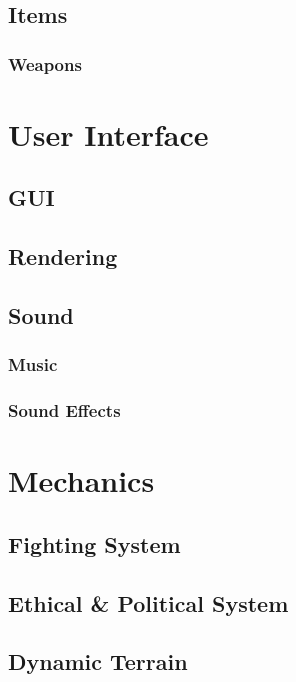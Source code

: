 \documentclass[a4paper]{report}
\begin{document}
	\chapter{Items}

		\section{Weapons}

\part{User Interface}

	\chapter{GUI}

	\chapter{Rendering}

	\chapter{Sound}

		\section{Music}

		\section{Sound Effects}

\part{Mechanics}

	\chapter{Fighting System}

	\chapter{Ethical \& Political System}

	\chapter{Dynamic Terrain}
\end{document}

